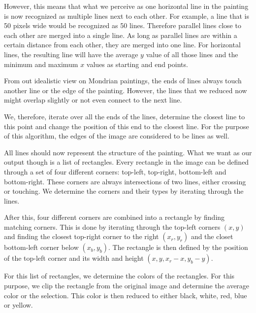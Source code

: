 However, this means that what we perceive as one horizontal line in the painting
is now recognized as multiple lines next to each other. For example, a line that
is 50 pixels wide would be recognized as 50 lines. Therefore parallel lines
close to each other are merged into a single line. As long as parallel lines are
within a certain distance from each other, they are merged into one line. For
horizontal lines, the resulting line will have the average $y$ value of all
those lines and the minimum and maximum $x$ values as starting and end points.

From out idealistic view on Mondrian paintings, the ends of lines always touch
another line or the edge of the painting. However, the lines that we reduced now
might overlap slightly or not even connect to the next line.

We, therefore, iterate over all the ends of the lines, determine the closest
line to this point and change the position of this end to the closest line. For
the purpose of this algorithm, the edges of the image are considered to be lines
as well.

All lines should now represent the structure of the painting. What we want as
our output though is a list of rectangles. Every rectangle in the image can be
defined through a set of four different corners: top-left, top-right,
bottom-left and bottom-right. These corners are always intersections of two
lines, either crossing or touching. We determine the corners and their types by
iterating through the lines.

After this, four different corners are combined into a rectangle by finding
matching corners. This is done by iterating through the top-left corners $(x,y)$
and finding the closest top-right corner to the right $(x_r, y_r)$ and the
closet bottom-left corner below $(x_b, y_b)$. The rectangle is then defined by
the position of the top-left corner and its width and height
$(x,y,x_r-x,y_b-y)$.

For this list of rectangles, we determine the colors of the rectangles. For this
purpose, we clip the rectangle from the original image and determine the average
color or the selection. This color is then reduced to either black, white, red,
blue or yellow.

